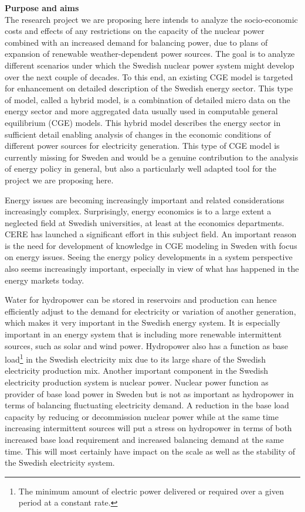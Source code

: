 \textbf{Purpose and aims}\\
The research project we are proposing here intends to analyze the socio-economic costs and effects of any restrictions on the capacity of the nuclear power combined with an increased demand for balancing power, due to plans of expansion of renewable weather-dependent power sources. The goal is to analyze different scenarios under which the Swedish nuclear power system might develop over the next couple of decades. To this end, an existing CGE model is targeted for enhancement on detailed description of the Swedish energy sector. This type of model, called a hybrid model, is a combination of detailed micro data on the energy sector and more aggregated data usually used in computable general equilibrium (CGE) models. This hybrid model describes the energy sector in sufficient detail enabling analysis of changes in the economic conditions of different power sources for electricity generation. This type of CGE model is currently missing for Sweden and would be a genuine contribution to the analysis of energy policy in general, but also a particularly well adapted tool for the project we are proposing here.

Energy issues are becoming increasingly important and related considerations increasingly complex. Surprisingly, energy economics is to a large extent a neglected field at Swedish universities, at least at the economics departments. CERE has launched a significant effort in this subject field. An important reason is the need for development of knowledge in CGE modeling in Sweden with focus on energy issues. Seeing the energy policy developments in a system perspective also seems increasingly important, especially in view of what has happened in the energy markets today.

Water for hydropower can be stored in reservoirs and production can hence efficiently adjust to the demand for electricity or variation of another generation, which makes it very important in the Swedish energy system. It is especially important in an energy system that is including more renewable intermittent sources, such as solar and wind power. Hydropower also has a function as base load\footnote{The minimum amount of electric power delivered or required over a given period at a constant rate.} in the Swedish electricity mix due to its large share of the Swedish electricity production mix. Another important component in the Swedish electricity production system is nuclear power. Nuclear power function as provider of base load power in Sweden but is not as important as hydropower in terms of balancing fluctuating electricity demand. A reduction in the base load capacity by reducing or decommission nuclear power while at the same time increasing intermittent sources will put a stress on hydropower in terms of both increased base load requirement and increased balancing demand at the same time. This will most certainly have impact on the scale as well as the stability of the Swedish electricity system.

